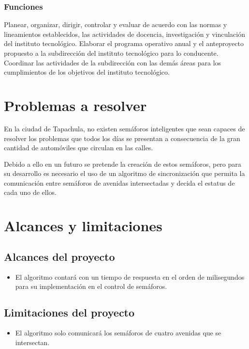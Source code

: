 \subsubsection*{Funciones}

Planear, organizar, dirigir, controlar y evaluar de acuerdo con las normas y lineamientos establecidos, las actividades de docencia, investigación y vinculación del instituto tecnológico. Elaborar el programa operativo anual y el anteproyecto propuesto a la subdirección del instituto tecnológico para lo conducente. Coordinar las actividades de la subdirección con las demás áreas para los cumplimientos de los objetivos del instituto tecnológico.

\section{Problemas a resolver}
En la ciudad de Tapachula, no existen semáforos inteligentes que sean capaces de resolver los problemas que todos los días se presentan a consecuencia de la gran cantidad de automóviles que circulan en las calles.

Debido a ello en un futuro se pretende la creación de estos semáforos, pero para su desarrollo es necesario el uso de un algoritmo de sincronización que permita la comunicación entre semáforos de avenidas intersectadas y decida el estatus de cada uno de ellos.

\section{Alcances y limitaciones}
\subsection*{Alcances del proyecto}
\begin{itemize}
	\item El algoritmo contará con un tiempo de respuesta en el orden de milisegundos para su implementación en el control de semáforos.
\end{itemize}

\subsection*{Limitaciones del proyecto}
\begin{itemize}
	\item El algoritmo solo comunicará los semáforos de cuatro avenidas que se intersectan.
\end{itemize}

